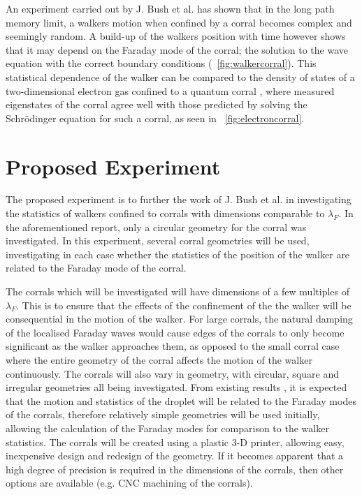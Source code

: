 \documentclass[11pt]{article}
\newcommand{\figref}[2][\figurename~]{#1\ref{#2}}
\begin{document}
An experiment carried out by J. Bush et al. \cite{12} has shown that in the long path memory limit, a walkers motion when confined by a corral becomes complex and seemingly random.  A build-up of the walkers position with time however shows that it may depend on the Faraday mode of the corral; the solution to the wave equation with the correct boundary conditions (\figref{fig:walkercorral}).  This statistical dependence of the walker can be compared to the density of states of a two-dimensional electron gas confined to a quantum corral \cite{21}, where measured eigenstates of the corral agree well with those predicted by solving the Schr{\"o}dinger equation for such a corral, as seen in \figref{fig:electroncorral}.

\section{Proposed Experiment}
\label{sec:proposedexperiment}

The proposed experiment is to further the work of J. Bush et al. \cite{12} in investigating the statistics of walkers confined to corrals with dimensions comparable to $\lambda_F$.  In the aforementioned report, only a circular geometry for the corral was investigated.  In this experiment, several corral geometries will be used, investigating in each case whether the statistics of the position of the walker are related to the Faraday mode of the corral.

The corrals which will be investigated will have dimensions of a few multiples of $\lambda_F$.  This is to ensure that the effects of the confinement of the the walker will be consequential in the motion of the walker.  For large corrals, the natural damping of the localised Faraday waves would cause edges of the corrals to only become significant as the walker approaches them, as opposed to the small corral case where the entire geometry of the corral affects the motion of the walker continuously.
The corrals will also vary in geometry, with circular, square and irregular geometries all being investigated.  From existing results \cite{12}, it is expected that the motion and statistics of the droplet will be related to the Faraday modes of the corrals, therefore relatively simple geometries will be used initially, allowing the calculation of the Faraday modes for comparison to the walker statistics.  The corrals will be created using a plastic 3-D printer, allowing easy, inexpensive design and redesign of the geometry.  If it becomes apparent that a high degree of precision is required in the dimensions of the corrals, then other options are available (e.g. CNC machining of the corrals).
\end{document}

